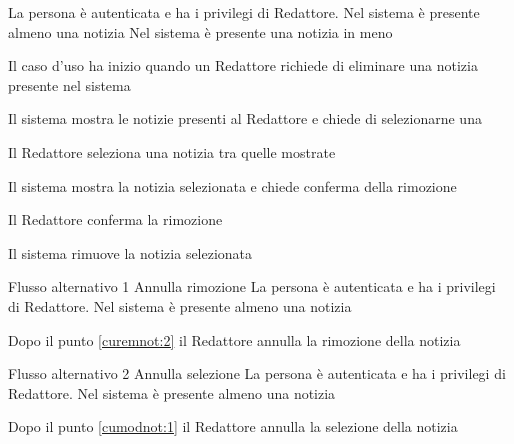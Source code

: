 {}
{La persona è autenticata e ha i privilegi di Redattore. Nel sistema è presente almeno una notizia}
{Nel sistema è presente una notizia in meno}
{\begin{enumCU}
	\item Il caso d'uso ha inizio quando un Redattore richiede di eliminare una notizia presente nel sistema
	\item Il sistema mostra le notizie presenti al Redattore e chiede di selezionarne una \label{cumodnot:1}
	\item Il Redattore seleziona una notizia tra quelle mostrate
	\item Il sistema mostra la notizia selezionata e chiede conferma della rimozione \label{curemnot:2}
	\item Il Redattore conferma la rimozione
	\item Il sistema rimuove la notizia selezionata
\end{enumCU}}
%
{Flusso alternativo 1}%
{Annulla rimozione}%
{La persona è autenticata e ha i privilegi di Redattore. Nel sistema è presente almeno una notizia}%
{\postNulle}%
{\begin{enumCU}
		\item Dopo il punto \ref{curemnot:2} il Redattore annulla la rimozione della notizia
	\end{enumCU}}%
%
{Flusso alternativo 2}%
{Annulla selezione}%
{La persona è autenticata e ha i privilegi di Redattore. Nel sistema è presente almeno una notizia}%
{\postNulle}%
{\begin{enumCU}
		\item Dopo il punto \ref{cumodnot:1} il Redattore annulla la selezione della notizia
\end{enumCU}}%

